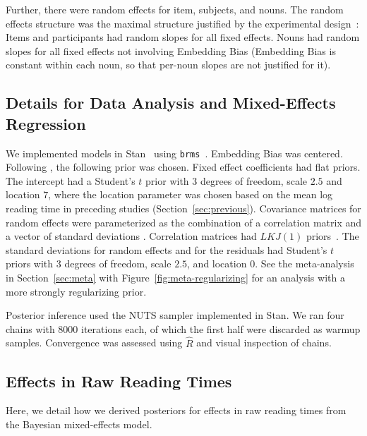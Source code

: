 Further, there were random effects for item, subjects, and nouns.
The random effects structure was the maximal structure justified by the experimental design~\citep{Barr2013RandomES}:
Items and participants had random slopes for all fixed effects.
Nouns had random slopes for all fixed effects not involving Embedding Bias (Embedding Bias is constant within each noun, so that per-noun slopes are not justified for it).


\subsection{Details for Data Analysis and Mixed-Effects Regression}\label{sec:regression-details}

We implemented models in Stan~\citep{carpenter2017stan} using \texttt{brms}~\citep{buerkner2017brms}.
Embedding Bias was centered.
Following \citet{buerkner2017brms}, the following prior was chosen.
Fixed effect coefficients had flat priors.
The intercept had a Student's $t$ prior with 3 degrees of freedom, scale $2.5$ and location $7$, where the location parameter was chosen based on the mean log reading time in preceding studies (Section~\ref{sec:previous}).
Covariance matrices for random effects were parameterized as the combination of a correlation matrix and a vector of standard deviations \citep{barnard2000modeling}.
Correlation matrices had $LKJ(1)$ priors~\citep{lewandowski2009generating}.
The standard deviations for random effects and for the residuals had Student's $t$ priors with 3 degrees of freedom, scale $2.5$, and location $0$.
See the meta-analysis in Section~\ref{sec:meta} with Figure~\ref{fig:meta-regularizing} for an analysis with a more strongly regularizing prior.

Posterior inference used the NUTS sampler \citep{homan2014the} implemented in Stan.
We ran four chains with 8000 iterations each, of which the first half were discarded as warmup samples.
Convergence was assessed using $\widehat{R}$ and visual inspection of chains.

\subsection{Effects in Raw Reading Times}\label{sec:effects-raw-rt}
Here, we detail how we derived posteriors for effects in raw reading times from the Bayesian mixed-effects model.

